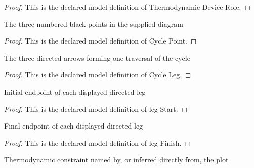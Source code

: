 \begin{proof}
  This is the declared model definition of Thermodynamic Device Role.
\end{proof}
\begin{definition}
  \label{def:physics:phyx-mini-0429:phyxminiproblems-problemphyxmini0429-cyclepoint}
  The three numbered black points in the supplied diagram
\end{definition}
\begin{proof}
  This is the declared model definition of Cycle Point.
\end{proof}
\begin{definition}
  \label{def:physics:phyx-mini-0429:phyxminiproblems-problemphyxmini0429-cycleleg}
  The three directed arrows forming one traversal of the cycle
\end{definition}
\begin{proof}
  This is the declared model definition of Cycle Leg.
\end{proof}
\begin{definition}
  \label{def:physics:phyx-mini-0429:phyxminiproblems-problemphyxmini0429-legstart}
  Initial endpoint of each displayed directed leg
\end{definition}
\begin{proof}
  This is the declared model definition of leg Start.
\end{proof}
\begin{definition}
  \label{def:physics:phyx-mini-0429:phyxminiproblems-problemphyxmini0429-legfinish}
  Final endpoint of each displayed directed leg
\end{definition}
\begin{proof}
  This is the declared model definition of leg Finish.
\end{proof}
\begin{definition}
  \label{def:physics:phyx-mini-0429:phyxminiproblems-problemphyxmini0429-processkind}
  Thermodynamic constraint named by, or inferred directly from, the plot
\end{definition}
